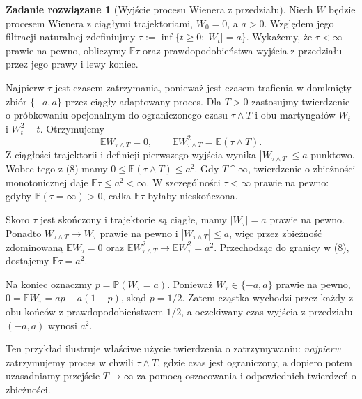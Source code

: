 \documentclass[11pt,a4paper,oneside]{report}
\numberwithin{equation}{chapter}
\theoremstyle{plain}
\theoremstyle{definition}
\newtheorem{zadanie}{Zadanie rozwiązane}[chapter]
\theoremstyle{remark}
\newcommand{\Prob}{\mathbb{P}}
\newcommand{\E}{\mathbb{E}}
\begin{document}
\begin{zadanie}[Wyjście procesu Wienera z przedziału]
Niech $W$ będzie procesem Wienera z ciągłymi trajektoriami,
$W_0=0$, a $a>0$. Względem jego filtracji naturalnej
zdefiniujmy
$\tau:=\inf\{t\ge0:|W_t|=a\}$.
Wykażemy, że $\tau<\infty$ prawie na pewno,
obliczymy $\E\tau$ oraz prawdopodobieństwa
wyjścia z przedziału przez jego prawy i lewy koniec.

Najpierw $\tau$ jest czasem zatrzymania,
ponieważ jest czasem trafienia w domknięty zbiór
$\{-a,a\}$ przez ciągły adaptowany proces.
Dla $T>0$ zastosujmy twierdzenie o próbkowaniu
opcjonalnym do ograniczonego czasu
$\tau\wedge T$ i obu martyngałów
$W_t$ i $W_t^2-t$. Otrzymujemy
\[
\E W_{\tau\wedge T}=0,
\qquad \E W_{\tau\wedge T}^2=\E(\tau\wedge T).
\tag{8}
\]
Z ciągłości trajektorii i definicji pierwszego
wyjścia wynika $|W_{\tau\wedge T}|\le a$
punktowo. Wobec tego z (8) mamy
$0\le\E(\tau\wedge T)\le a^2$.
Gdy $T\uparrow\infty$, twierdzenie o zbieżności
monotonicznej daje $\E\tau\le a^2<\infty$.
W szczególności $\tau<\infty$ prawie na pewno:
gdyby $\Prob(\tau=\infty)>0$, całka $\E\tau$
byłaby nieskończona.

Skoro $\tau$ jest skończony i trajektorie są ciągłe,
mamy $|W_\tau|=a$ prawie na pewno.
Ponadto $W_{\tau\wedge T}\to W_\tau$ prawie na pewno
i $|W_{\tau\wedge T}|\le a$, więc przez zbieżność
zdominowaną $\E W_\tau=0$ oraz
$\E W_{\tau\wedge T}^2\to\E W_\tau^2=a^2$.
Przechodząc do granicy w (8), dostajemy
$\E\tau=a^2$.

Na koniec oznaczmy $p=\Prob(W_\tau=a)$.
Ponieważ $W_\tau\in\{-a,a\}$ prawie na pewno,
$0=\E W_\tau=ap-a(1-p)$, skąd $p=1/2$.
Zatem cząstka wychodzi przez każdy z obu końców z
prawdopodobieństwem $1/2$, a oczekiwany czas wyjścia
z przedziału $(-a,a)$ wynosi $a^2$.

Ten przykład ilustruje właściwe użycie twierdzenia
o zatrzymywaniu: \emph{najpierw} zatrzymujemy proces
w chwili $\tau\wedge T$, gdzie czas jest ograniczony,
a dopiero potem uzasadniamy przejście $T\to\infty$
za pomocą oszacowania i odpowiednich twierdzeń
o zbieżności.
\end{zadanie}
\end{document}
